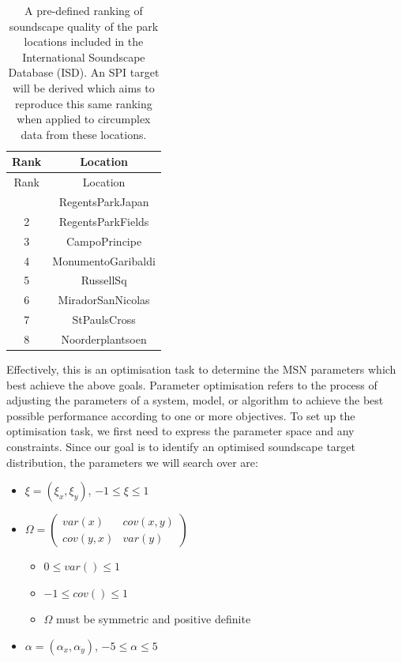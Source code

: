 \documentclass[
  authoryear,
  preprint,
  3p]{elsarticle}
\providecommand{\tightlist}{%
  \setlength{\itemsep}{0pt}\setlength{\parskip}{0pt}}\usepackage{longtable,booktabs,array}
\begin{document}
\begin{longtable}[]{@{}cc@{}}
\caption{A pre-defined ranking of soundscape quality of the park
locations included in the International Soundscape Database (ISD). An
SPI target will be derived which aims to reproduce this same ranking
when applied to circumplex data from these
locations.}\label{tbl-isd-ranking}\tabularnewline
\toprule\noalign{}
Rank & Location \\
\midrule\noalign{}
\endfirsthead
\toprule\noalign{}
Rank & Location \\
\midrule\noalign{}
\endhead
\bottomrule\noalign{}
\endlastfoot
1 & RegentsParkJapan \\
2 & RegentsParkFields \\
3 & CampoPrincipe \\
4 & MonumentoGaribaldi \\
5 & RussellSq \\
6 & MiradorSanNicolas \\
7 & StPaulsCross \\
8 & Noorderplantsoen \\
\end{longtable}

Effectively, this is an optimisation task to determine the MSN
parameters which best achieve the above goals. Parameter optimisation
refers to the process of adjusting the parameters of a system, model, or
algorithm to achieve the best possible performance according to one or
more objectives. To set up the optimisation task, we first need to
express the parameter space and any constraints. Since our goal is to
identify an optimised soundscape target distribution, the parameters we
will search over are:

\begin{itemize}
\tightlist
\item
  \(\xi = (\xi_x, \xi_y)\), \(-1 \leq \xi \leq 1\)
\item
  \(\Omega = \begin{pmatrix} var(x) & cov(x, y) \\ cov(y, x) & var(y) \end{pmatrix}\)

  \begin{itemize}
  \tightlist
  \item
    \(0 \leq var() \leq 1\)
  \item
    \(-1 \leq cov() \leq 1\)
  \item
    \(\Omega\) must be symmetric and positive definite
  \end{itemize}
\item
  \(\alpha = (\alpha_x, \alpha_y)\), \(-5 \leq \alpha \leq 5\)
\end{itemize}
\end{document}
